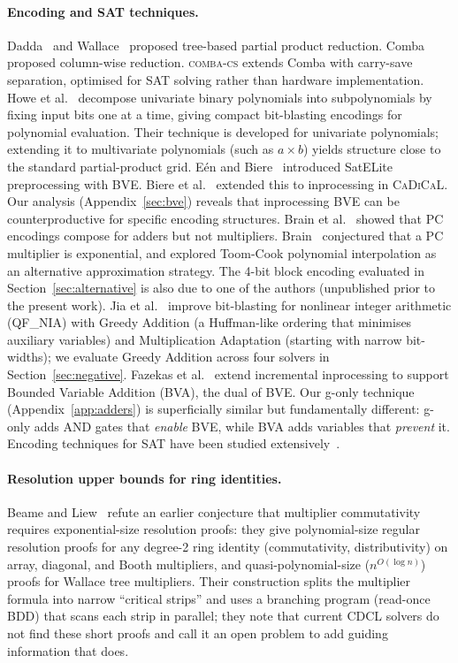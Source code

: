\documentclass[a4paper]{ceurart}
\newcommand{\combacs}{\textsc{comba-cs}\xspace}
\newcommand{\cadical}{\textsc{CaDiCaL}\xspace}
\begin{document}
\paragraph{Encoding and SAT techniques.}
Dadda~\cite{dadda1965some} and Wallace~\cite{wallace1964suggestion}
proposed tree-based partial product reduction.
Comba~\cite{comba1990exponentiation} proposed column-wise reduction.
\combacs extends Comba with carry-save separation, optimised for SAT
solving rather than hardware implementation.
Howe et al.~\cite{howe2025subpolynomial} decompose univariate binary
polynomials into subpolynomials by fixing input bits one at a time,
giving compact bit-blasting encodings for polynomial evaluation.
Their technique is developed for univariate polynomials; extending
it to multivariate polynomials (such as $a \times b$) yields
structure close to the standard partial-product grid.
E\'en and Biere~\cite{een2005effective} introduced SatELite
preprocessing with BVE. Biere et al.~\cite{biere2019cadical} extended
this to inprocessing in \cadical. Our analysis
(Appendix~\ref{sec:bve}) reveals that inprocessing BVE can be
counterproductive for specific encoding structures.
Brain et al.~\cite{brain2016propagation} showed that PC encodings
compose for adders but not multipliers.
Brain~\cite{brain2021wrong} conjectured that a PC multiplier
is exponential, and explored Toom-Cook polynomial interpolation as
an alternative approximation strategy. The 4-bit block encoding
evaluated in Section~\ref{sec:alternative} is also due to one of
the authors (unpublished prior to the present work).
Jia et al.~\cite{jia2023improving} improve bit-blasting for
nonlinear integer arithmetic (QF\_NIA) with Greedy Addition (a
Huffman-like ordering that minimises auxiliary variables) and
Multiplication Adaptation (starting with narrow bit-widths);
we evaluate Greedy Addition across four solvers in
Section~\ref{sec:negative}.
Fazekas et al.~\cite{fazekas2025incremental} extend incremental
inprocessing to support Bounded Variable Addition (BVA), the dual
of BVE. Our g-only technique (Appendix~\ref{app:adders}) is
superficially similar but fundamentally different: g-only adds
AND gates that \emph{enable} BVE, while BVA adds variables that
\emph{prevent} it.
Encoding techniques for SAT have been studied
extensively~\cite{tseitin1983complexity,plaisted1986structure}.

\paragraph{Resolution upper bounds for ring identities.}
Beame and Liew~\cite{beame2017towards,beame2019toward} refute
an earlier conjecture that multiplier commutativity requires
exponential-size resolution proofs: they give polynomial-size
regular resolution proofs for any degree-2 ring identity
(commutativity, distributivity) on array, diagonal, and Booth
multipliers, and quasi-polynomial-size ($n^{O(\log n)}$) proofs
for Wallace tree multipliers. Their construction splits the
multiplier formula into narrow ``critical strips'' and uses
a branching program (read-once BDD) that scans each strip in
parallel; they note that current CDCL solvers do not find these
short proofs and call it an open problem to add guiding
information that does.
\end{document}
